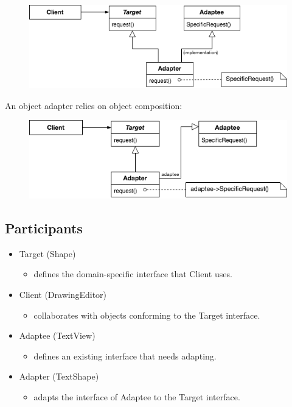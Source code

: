 \begin{figure}[H]
\centering
\includegraphics[scale=0.7]{diagrams/adapter_structure_a.png}
\end{figure}

An object adapter relies on object composition:

\begin{figure}[H]
\centering
\includegraphics[scale=0.7]{diagrams/adapter_structure_b.png}
\end{figure}

\subsection*{Participants}

\begin{itemize}
    \item Target (Shape)
    \begin{itemize}
        \item defines the domain-specific interface that Client uses.
    \end{itemize}
    \item Client (DrawingEditor)
    \begin{itemize}
        \item collaborates with objects conforming to the Target interface.
    \end{itemize}
    \item Adaptee (TextView)
    \begin{itemize}
        \item defines an existing interface that needs adapting.
    \end{itemize}
    \item Adapter (TextShape)
    \begin{itemize}
        \item adapts the interface of Adaptee to the Target interface.
    \end{itemize}
\end{itemize}

